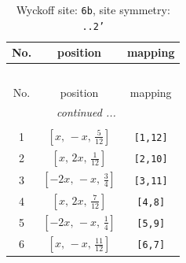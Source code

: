 \documentclass[fleqn,8pt]{jsarticle}
\begin{document}
\begin{longtable}{ccc}
\caption{Wyckoff site: {\tt 6b}, site symmetry: {\tt ..2'}}
 \\
 \hline \hline
No. & position & mapping \\ \hline \endfirsthead

\multicolumn{2}{l}{\tablename\ \thetable{}} \\
 \hline \hline
No. & position & mapping \\ \hline \endhead

 \hline \hline
\multicolumn{2}{r}{\footnotesize\it continued ...} \\ \endfoot

 \hline \hline
\multicolumn{2}{r}{} \\ \endlastfoot

1 & $\left[ x,\, - x,\, \frac{5}{12} \right]$ & {\tt [1,12]} \\ \hline
2 & $\left[ x,\, 2 x,\, \frac{1}{12} \right]$ & {\tt [2,10]} \\ \hline
3 & $\left[ - 2 x,\, - x,\, \frac{3}{4} \right]$ & {\tt [3,11]} \\ \hline
4 & $\left[ x,\, 2 x,\, \frac{7}{12} \right]$ & {\tt [4,8]} \\ \hline
5 & $\left[ - 2 x,\, - x,\, \frac{1}{4} \right]$ & {\tt [5,9]} \\ \hline
6 & $\left[ x,\, - x,\, \frac{11}{12} \right]$ & {\tt [6,7]} \\
\end{longtable}
\renewcommand{\arraystretch}{1.2}
\end{document}
